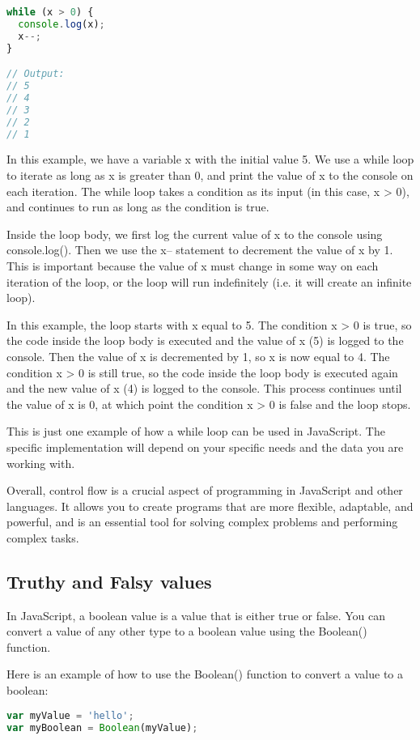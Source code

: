 {\begin{lstlisting}[language=Javascript, caption=Example of while loop in Javascript]
while (x > 0) {
  console.log(x);
  x--;
}

// Output:
// 5
// 4
// 3
// 2
// 1

\end{lstlisting}
In this example, we have a variable x with the initial value 5. We use a while loop to iterate as long as x is greater than 0, and print the value of x to the console on each iteration. The while loop takes a condition as its input (in this case, x > 0), and continues to run as long as the condition is true.

Inside the loop body, we first log the current value of x to the console using console.log(). Then we use the x-- statement to decrement the value of x by 1. This is important because the value of x must change in some way on each iteration of the loop, or the loop will run indefinitely (i.e. it will create an infinite loop).

In this example, the loop starts with x equal to 5. The condition x > 0 is true, so the code inside the loop body is executed and the value of x (5) is logged to the console. Then the value of x is decremented by 1, so x is now equal to 4. The condition x > 0 is still true, so the code inside the loop body is executed again and the new value of x (4) is logged to the console. This process continues until the value of x is 0, at which point the condition x > 0 is false and the loop stops.

This is just one example of how a while loop can be used in JavaScript. The specific implementation will depend on your specific needs and the data you are working with.

Overall, control flow is a crucial aspect of programming in JavaScript and other languages. It allows you to create programs that are more flexible, adaptable, and powerful, and is an essential tool for solving complex problems and performing complex tasks.

\subsection{Truthy and Falsy values}
In JavaScript, a boolean value is a value that is either true or false. You can convert a value of any other type to a boolean value using the Boolean() function.

Here is an example of how to use the Boolean() function to convert a value to a boolean:

\begin{lstlisting}[language=Javascript, nolol]
var myValue = 'hello';
var myBoolean = Boolean(myValue);
\end{lstlisting}

}
